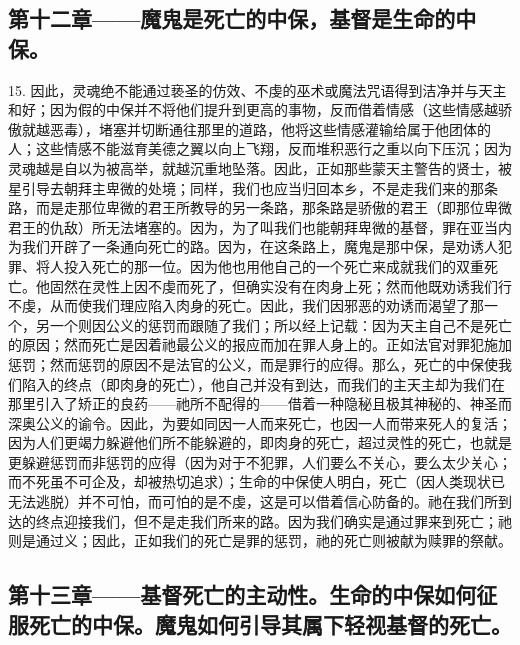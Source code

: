 
\subsection{第十二章——魔鬼是死亡的中保，基督是生命的中保。}

15. 因此，灵魂绝不能通过亵圣的仿效、不虔的巫术或魔法咒语得到洁净并与天主和好；因为假的中保并不将他们提升到更高的事物，反而借着情感（这些情感越骄傲就越恶毒），堵塞并切断通往那里的道路，他将这些情感灌输给属于他团体的人；这些情感不能滋育美德之翼以向上飞翔，反而堆积恶行之重以向下压沉；因为灵魂越是自以为被高举，就越沉重地坠落。因此，正如那些蒙天主警告的贤士，被星引导去朝拜主卑微的处境；同样，我们也应当归回本乡，不是走我们来的那条路，而是走那位卑微的君王所教导的另一条路，那条路是骄傲的君王（即那位卑微君王的仇敌）所无法堵塞的。因为，为了叫我们也能朝拜卑微的基督，罪在亚当内为我们开辟了一条通向死亡的路。因为，在这条路上，魔鬼是那中保，是劝诱人犯罪、将人投入死亡的那一位。因为他也用他自己的一个死亡来成就我们的双重死亡。他固然在灵性上因不虔而死了，但确实没有在肉身上死；然而他既劝诱我们行不虔，从而使我们理应陷入肉身的死亡。因此，我们因邪恶的劝诱而渴望了那一个，另一个则因公义的惩罚而跟随了我们；所以经上记载：因为天主自己不是死亡的原因；然而死亡是因着祂最公义的报应而加在罪人身上的。正如法官对罪犯施加惩罚；然而惩罚的原因不是法官的公义，而是罪行的应得。那么，死亡的中保使我们陷入的终点（即肉身的死亡），他自己并没有到达，而我们的主天主却为我们在那里引入了矫正的良药——祂所不配得的——借着一种隐秘且极其神秘的、神圣而深奥公义的谕令。因此，为要如同因一人而来死亡，也因一人而带来死人的复活；因为人们更竭力躲避他们所不能躲避的，即肉身的死亡，超过灵性的死亡，也就是更躲避惩罚而非惩罚的应得（因为对于不犯罪，人们要么不关心，要么太少关心；而不死虽不可企及，却被热切追求）；生命的中保使人明白，死亡（因人类现状已无法逃脱）并不可怕，而可怕的是不虔，这是可以借着信心防备的。祂在我们所到达的终点迎接我们，但不是走我们所来的路。因为我们确实是通过罪来到死亡；祂则是通过义；因此，正如我们的死亡是罪的惩罚，祂的死亡则被献为赎罪的祭献。\par


\subsection{第十三章——基督死亡的主动性。生命的中保如何征服死亡的中保。魔鬼如何引导其属下轻视基督的死亡。}

